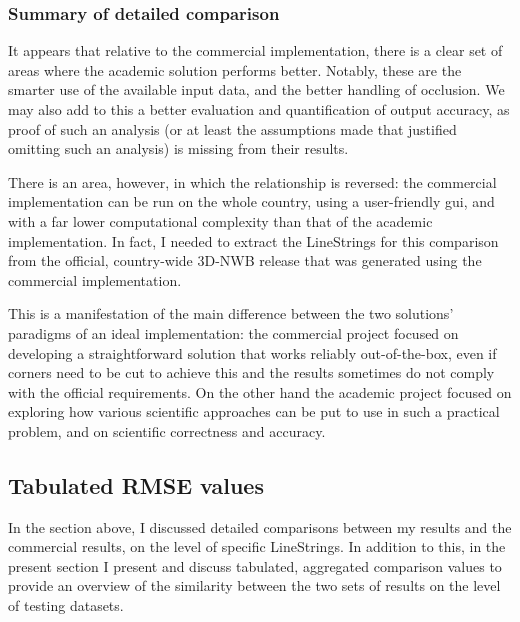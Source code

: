 \subsubsection{Summary of detailed comparison}

It appears that relative to the commercial implementation, there is a clear set of areas where the academic solution performs better. Notably, these are the smarter use of the available input data, and the better handling of occlusion. We may also add to this a better evaluation and quantification of output accuracy, as proof of such an analysis (or at least the assumptions made that justified omitting such an analysis) is missing from their results. 

There is an area, however, in which the relationship is reversed: the commercial implementation can be run on the whole country, using a user-friendly \ac{gui}, and with a far lower computational complexity than that of the academic implementation. In fact, I needed to extract the LineStrings for this comparison from the official, country-wide 3D-NWB release that was generated using the commercial implementation.

This is a manifestation of the main difference between the two solutions' paradigms of an ideal implementation: the commercial project focused on developing a straightforward solution that works reliably out-of-the-box, even if corners need to be cut to achieve this and the results sometimes do not comply with the official requirements. On the other hand the academic project focused on exploring how various scientific approaches can be put to use in such a practical problem, and on scientific correctness and accuracy.

\subsection{Tabulated RMSE values}
\label{sub:comparisontabulated}

In the section above, I discussed detailed comparisons between my results and the commercial results, on the level of specific LineStrings. In addition to this, in the present section I present and discuss tabulated, aggregated comparison values to provide an overview of the similarity between the two sets of results on the level of testing datasets.

